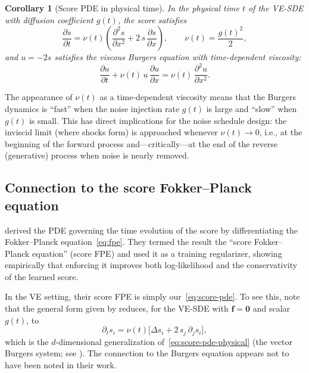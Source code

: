 \documentclass[11pt]{article}
\newtheorem{corollary}[theorem]{Corollary}
\begin{document}
\begin{corollary}[Score PDE in physical time]\label{cor:physical-time}
In the physical time $t$ of the VE-SDE with diffusion coefficient $g(t)$, the score satisfies
\begin{equation}\label{eq:score-pde-physical}
  \frac{\partial s}{\partial t}
  = \nu(t)\!\left(\frac{\partial^2 s}{\partial x^2} + 2\,s\,\frac{\partial s}{\partial x}\right),
  \qquad \nu(t) = \frac{g(t)^2}{2},
\end{equation}
and $u = -2s$ satisfies the viscous Burgers equation with time-dependent viscosity:
\begin{equation}\label{eq:burgers-physical}
  \frac{\partial u}{\partial t} + \nu(t)\,u\,\frac{\partial u}{\partial x}
  = \nu(t)\,\frac{\partial^2 u}{\partial x^2}.
\end{equation}
\end{corollary}

The appearance of $\nu(t)$ as a time-dependent viscosity means that the Burgers dynamics is ``fast'' when the noise injection rate $g(t)$ is large and ``slow'' when $g(t)$ is small.
This has direct implications for the noise schedule design: the inviscid limit (where shocks form) is approached whenever $\nu(t) \to 0$, i.e., at the beginning of the forward process and---critically---at the end of the reverse (generative) process when noise is nearly removed.

\subsection{Connection to the score Fokker--Planck equation}\label{sec:sb:connection}

\citet{lai2023fp} derived the PDE governing the time evolution of the score by differentiating the Fokker--Planck equation~\eqref{eq:fpe}.
They termed the result the ``score Fokker--Planck equation'' (score FPE) and used it as a training regularizer, showing empirically that enforcing it improves both log-likelihood and the conservativity of the learned score.

In the VE setting, their score FPE is simply our~\eqref{eq:score-pde}.
To see this, note that the general form given by \citet[Eq.~(8)]{lai2023fp} reduces, for the VE-SDE with $\bm{f} = \bm{0}$ and scalar $g(t)$, to
\[
  \partial_t s_i = \nu(t)\bigl[\Delta s_i + 2\,s_j\,\partial_j s_i\bigr],
\]
which is the $d$-dimensional generalization of~\eqref{eq:score-pde-physical} (the vector Burgers system; see ).
The connection to the Burgers equation appears not to have been noted in their work.
\end{document}
